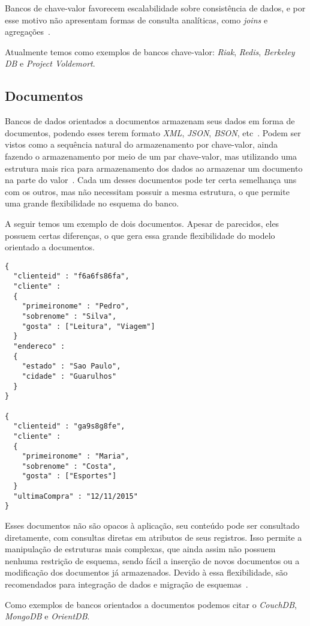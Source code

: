 Bancos de chave-valor favorecem escalabilidade sobre consistência de dados, e por esse motivo não apresentam formas de consulta analíticas, como \emph{joins} e agregações~\cite{chrisnosql}.

Atualmente temos como exemplos de bancos chave-valor: \emph{Riak}, \emph{Redis}, \emph{Berkeley DB} e \emph{Project Voldemort}.

\subsection*{Documentos}
Bancos de dados orientados a documentos armazenam seus dados em forma de documentos, podendo esses terem formato \emph{XML}, \emph{JSON}, \emph{BSON}, etc~\cite{pramod}. Podem ser vistos como a sequência natural do armazenamento por chave-valor, ainda fazendo o armazenamento por meio de um par chave-valor, mas utilizando uma estrutura mais rica para armazenamento dos dados ao armazenar um documento na parte do valor~\cite{chrisnosql}. Cada um desses documentos pode ter certa semelhança uns com os outros, mas não necessitam possuir a mesma estrutura, o que permite uma grande flexibilidade no esquema do banco.

A seguir temos um exemplo de dois documentos. Apesar de parecidos, eles possuem certas diferenças, o que gera essa grande flexibilidade do modelo orientado a documentos.

\begin{lstlisting}
{
  "clienteid" : "f6a6fs86fa",
  "cliente" :
  {
    "primeironome" : "Pedro",
    "sobrenome" : "Silva", 
    "gosta" : ["Leitura", "Viagem"]
  }
  "endereco" : 
  {
    "estado" : "Sao Paulo",
    "cidade" : "Guarulhos"
  }
}

{
  "clienteid" : "ga9s8g8fe",
  "cliente" :
  {
    "primeironome" : "Maria",
    "sobrenome" : "Costa", 
    "gosta" : ["Esportes"]
  }
  "ultimaCompra" : "12/11/2015"
}
\end{lstlisting}

Esses documentos não são opacos à aplicação, seu conteúdo pode ser consultado diretamente, com consultas diretas em atributos de seus registros. Isso permite a manipulação de estruturas mais complexas, que ainda assim não possuem nenhuma restrição de esquema, sendo fácil a inserção de novos documentos ou a modificação dos documentos já armazenados. Devido à essa flexibilidade, são recomendados para integração de dados e migração de esquemas~\cite{nosqleval}. 

Como exemplos de bancos orientados a documentos podemos citar o \emph{CouchDB}, \emph{MongoDB} e \emph{OrientDB}.

